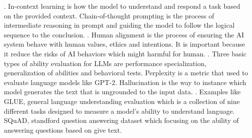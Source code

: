 {. In-context learning is how the model to understand and respond a task based on the provided context. Chain-of-thought prompting is the process of intermediate reasoning in prompt and guiding the model to follow the logical sequence to the conclusion.
. Human alignment is the process of ensuring the AI system behave with human values, ethics and intentions. It is important because it reduce the risks of AI behaviors which might harmful for human.
. Three basic types of ability evaluation for LLMs are performance specialization, generalization of abilities and behavioral tests. Perplexity is a metric that used to evaluate language models like GPT-2. Hallucination is the way to instance which model generates the text that is ungrounded to the input data.
. Examples like GLUE, general language understanding evaluation which is a collection of nine different tasks designed to measure a model’s ability to understand language. SQuAD, standford question answering dataset which focusing on the ability of answering questions based on give text. 
\newline
}
